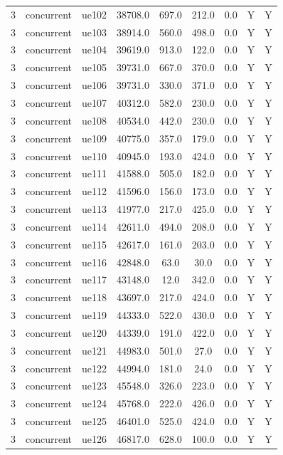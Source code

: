 \begin{table}[ht]
\begin{tabular}{|c|c|c|c|c|c|c|c|c|}
3 & concurrent & ue102 & 38708.0 & 697.0 & 212.0 & 0.0 & Y & Y \\
3 & concurrent & ue103 & 38914.0 & 560.0 & 498.0 & 0.0 & Y & Y \\
3 & concurrent & ue104 & 39619.0 & 913.0 & 122.0 & 0.0 & Y & Y \\
3 & concurrent & ue105 & 39731.0 & 667.0 & 370.0 & 0.0 & Y & Y \\
3 & concurrent & ue106 & 39731.0 & 330.0 & 371.0 & 0.0 & Y & Y \\
3 & concurrent & ue107 & 40312.0 & 582.0 & 230.0 & 0.0 & Y & Y \\
3 & concurrent & ue108 & 40534.0 & 442.0 & 230.0 & 0.0 & Y & Y \\
3 & concurrent & ue109 & 40775.0 & 357.0 & 179.0 & 0.0 & Y & Y \\
3 & concurrent & ue110 & 40945.0 & 193.0 & 424.0 & 0.0 & Y & Y \\
3 & concurrent & ue111 & 41588.0 & 505.0 & 182.0 & 0.0 & Y & Y \\
3 & concurrent & ue112 & 41596.0 & 156.0 & 173.0 & 0.0 & Y & Y \\
3 & concurrent & ue113 & 41977.0 & 217.0 & 425.0 & 0.0 & Y & Y \\
3 & concurrent & ue114 & 42611.0 & 494.0 & 208.0 & 0.0 & Y & Y \\
3 & concurrent & ue115 & 42617.0 & 161.0 & 203.0 & 0.0 & Y & Y \\
3 & concurrent & ue116 & 42848.0 & 63.0 & 30.0 & 0.0 & Y & Y \\
3 & concurrent & ue117 & 43148.0 & 12.0 & 342.0 & 0.0 & Y & Y \\
3 & concurrent & ue118 & 43697.0 & 217.0 & 424.0 & 0.0 & Y & Y \\
3 & concurrent & ue119 & 44333.0 & 522.0 & 430.0 & 0.0 & Y & Y \\
3 & concurrent & ue120 & 44339.0 & 191.0 & 422.0 & 0.0 & Y & Y \\
3 & concurrent & ue121 & 44983.0 & 501.0 & 27.0 & 0.0 & Y & Y \\
3 & concurrent & ue122 & 44994.0 & 181.0 & 24.0 & 0.0 & Y & Y \\
3 & concurrent & ue123 & 45548.0 & 326.0 & 223.0 & 0.0 & Y & Y \\
3 & concurrent & ue124 & 45768.0 & 222.0 & 426.0 & 0.0 & Y & Y \\
3 & concurrent & ue125 & 46401.0 & 525.0 & 424.0 & 0.0 & Y & Y \\
3 & concurrent & ue126 & 46817.0 & 628.0 & 100.0 & 0.0 & Y & Y \\

\end{tabular}
\end{table}
